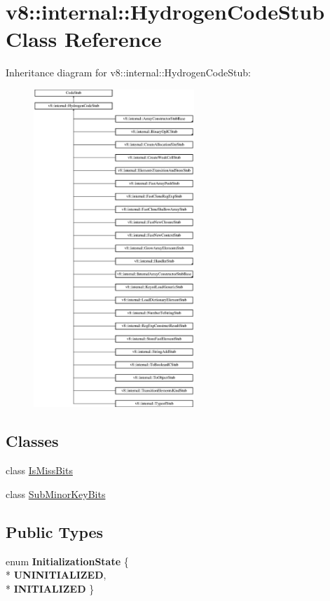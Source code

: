 \hypertarget{classv8_1_1internal_1_1_hydrogen_code_stub}{}\section{v8\+:\+:internal\+:\+:Hydrogen\+Code\+Stub Class Reference}
\label{classv8_1_1internal_1_1_hydrogen_code_stub}
Inheritance diagram for v8\+:\+:internal\+:\+:Hydrogen\+Code\+Stub\+:\begin{figure}[H]
\begin{center}
\leavevmode
\includegraphics[height=12.000000cm]{classv8_1_1internal_1_1_hydrogen_code_stub}
\end{center}
\end{figure}
\subsection*{Classes}
\begin{DoxyCompactItemize}
\item 
class \hyperlink{classv8_1_1internal_1_1_hydrogen_code_stub_1_1_is_miss_bits}{Is\+Miss\+Bits}
\item 
class \hyperlink{classv8_1_1internal_1_1_hydrogen_code_stub_1_1_sub_minor_key_bits}{Sub\+Minor\+Key\+Bits}
\end{DoxyCompactItemize}
\subsection*{Public Types}
\begin{DoxyCompactItemize}
\item 
enum {\bfseries Initialization\+State} \{ \\*
{\bfseries U\+N\+I\+N\+I\+T\+I\+A\+L\+I\+Z\+ED}, 
\\*
{\bfseries I\+N\+I\+T\+I\+A\+L\+I\+Z\+ED}
 \}\hypertarget{classv8_1_1internal_1_1_hydrogen_code_stub_a50c53ec58ef10a4a385cdce34301550b}{}\label{classv8_1_1internal_1_1_hydrogen_code_stub_a50c53ec58ef10a4a385cdce34301550b}

\end{DoxyCompactItemize}
